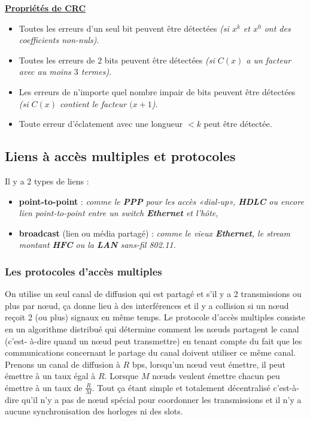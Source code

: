\documentclass{article}
\newcommand{\stitre}[1]{\noindent\textbf{\underline{#1}} \\}
\newcommand{\neu}{n\oe ud}
\newcommand{\neuSP}{n\oe ud }
\newcommand{\neuSPs}{n\oe uds }
\begin{document}
\stitre{Propriétés de CRC}

\begin{itemize}
\item Toutes les erreurs d'un seul bit peuvent être détectées \textit{(si $x^k$ et $x^0$ ont des coefficients 
non-nuls)}.
\item Toutes les erreurs de 2 bits peuvent être détectées \textit{(si $C(x)$ a un facteur avec au moins $3$ 
termes)}.
\item Les erreurs de n'importe quel nombre impair de bits peuvent être détectées \textit{(si $C(x)$ contient le 
facteur $(x+1$)}.
\item Toute erreur d'éclatement avec une longueur $< k$ peut être détectée.
\end{itemize}

\subsection{Liens à accès multiples et protocoles}

Il y a 2 types de liens : 
\begin{itemize}
\item\textbf{point-to-point} : \textit{comme le \textbf{PPP} pour les accès «dial-up», \textbf{HDLC} ou encore 
lien point-to-point entre un switch \textbf{Ethernet} et l'hôte,}
\item\textbf{broadcast} (lien ou média partagé) : \textit{comme le vieux \textbf{Ethernet}, le stream montant 
\textbf{HFC} ou la \textbf{LAN} sans-fil 802.11.}
\end{itemize}

\subsubsection{Les protocoles d'accès multiples}

On utilise un seul canal de diffusion qui est partagé et s'il y a 2 transmissions ou plus par \neu , ça donne 
lieu à des interférences et il y a collision si un \neuSP reçoit 2 (ou plus) signaux en même temps. Le protocole 
d'accès multiples consiste en un algorithme distribué qui détermine comment les \neuSPs partagent le canal (c'est-
à-dire quand un \neuSP peut transmettre) en tenant compte du fait que les communications concernant le partage du 
canal doivent utiliser ce même canal. \\
Prenons un canal de diffusion à $R$ bps, lorsqu'un \neuSP veut émettre, il peut émettre à un taux égal à $R$. 
Lorsque $M$ \neuSPs veulent émettre chacun peu émettre à un taux de $\frac{R}{M}$. Tout ça étant simple et 
totalement décentralisé c'est-à-dire qu'il n'y a pas de \neuSP spécial pour coordonner les transmissions et il n'y 
a aucune synchronisation des horloges ni des slots. \\
\end{document}
